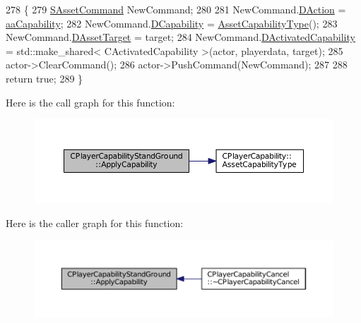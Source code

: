 \begin{DoxyCode}
278                                                                                                            
                                                               \{
279     \hyperlink{structSAssetCommand}{SAssetCommand} NewCommand;
280     
281     NewCommand.\hyperlink{structSAssetCommand_a8edd3b3d59a76d5514ba403bc8076a75}{DAction} = \hyperlink{GameDataTypes_8h_ab47668e651a3032cfb9c40ea2d60d670acf9fb164e8abd71c71f4a8c7fda360d4}{aaCapability};
282     NewCommand.\hyperlink{structSAssetCommand_a734ea7c6847457b437360f333f570ff9}{DCapability} = \hyperlink{classCPlayerCapability_a433bb196cd6ab6a932f1cac102b3aa98}{AssetCapabilityType}();
283     NewCommand.\hyperlink{structSAssetCommand_a3d9b43f6e59c386c48c41a65448a0c39}{DAssetTarget} = target;
284     NewCommand.\hyperlink{structSAssetCommand_ad8beda19520811cc70fe1eab16c774dd}{DActivatedCapability} = std::make\_shared< CActivatedCapability >(actor, 
      playerdata, target);
285     actor->ClearCommand();
286     actor->PushCommand(NewCommand);
287 
288     \textcolor{keywordflow}{return} \textcolor{keyword}{true};
289 \}
\end{DoxyCode}
Here is the call graph for this function\+:
\nopagebreak
\begin{figure}[H]
\begin{center}
\leavevmode
\includegraphics[width=350pt]{classCPlayerCapabilityStandGround_a3e1beee9125b2a940f803c3234866bb2_cgraph}
\end{center}
\end{figure}
Here is the caller graph for this function\+:
\nopagebreak
\begin{figure}[H]
\begin{center}
\leavevmode
\includegraphics[width=350pt]{classCPlayerCapabilityStandGround_a3e1beee9125b2a940f803c3234866bb2_icgraph}
\end{center}
\end{figure}
\hypertarget{classCPlayerCapabilityStandGround_a468f2618edaebf2088b5917d2688b6f6}{}\label{classCPlayerCapabilityStandGround_a468f2618edaebf2088b5917d2688b6f6} 
